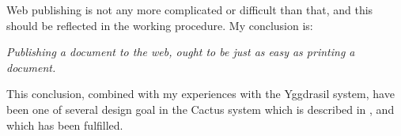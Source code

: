Web publishing is not any more complicated or difficult than that, and
this should be reflected in the working procedure.  My conclusion is:

\begin{center}
  \textit{Publishing a document to the web, ought to be just
    as easy as printing a document.}
\end{center}

This conclusion, combined with my experiences with the Yggdrasil
system, have been one of several design goal in the Cactus system
which is described in , and which has been
fulfilled.










